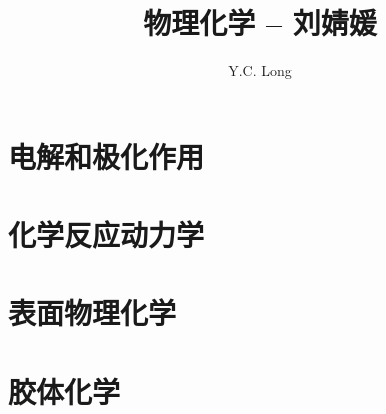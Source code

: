 \documentclass[a4paper]{ctexrep}
\author{Y.C. Long}
\title{物理化学 -- 刘婧媛}
\begin{document}
    \maketitle
    \tableofcontents

    
    

    \chapter{电解和极化作用}

    \chapter{化学反应动力学}

    \chapter{表面物理化学}

    \chapter{胶体化学}
\end{document}

